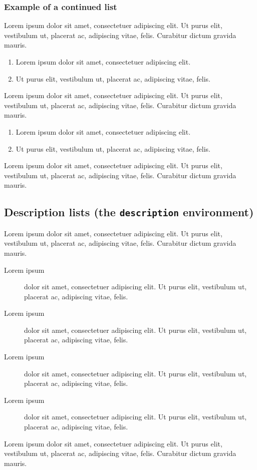 \documentclass[draft*,nochapters]{aaltoseries}
\begin{document}
\subsubsection{Example of a continued list}
Lorem ipsum dolor sit amet, consectetuer adipiscing elit. Ut purus elit,  vestibulum ut, placerat ac, adipiscing vitae, felis. Curabitur dictum gravida mauris.
\begin{enumerate}
\setlength{\itemsep}{0mm}
\item Lorem ipsum dolor sit amet, consectetuer adipiscing elit.
\item Ut purus elit,  vestibulum ut, placerat ac, adipiscing vitae, felis.
\end{enumerate}
Lorem ipsum dolor sit amet, consectetuer adipiscing elit. Ut purus elit,  vestibulum ut, placerat ac, adipiscing vitae, felis. Curabitur dictum gravida mauris.
\begin{enumerate}
\setlength{\itemsep}{0mm}
\setcounter{enumi}{2}
\item Lorem ipsum dolor sit amet, consectetuer adipiscing elit.
\item Ut purus elit,  vestibulum ut, placerat ac, adipiscing vitae, felis.
\end{enumerate}
Lorem ipsum dolor sit amet, consectetuer adipiscing elit. Ut purus elit,  vestibulum ut, placerat ac, adipiscing vitae, felis. Curabitur dictum gravida mauris.

\subsection{Description lists (the \texttt{description} environment)}

Lorem ipsum dolor sit amet, consectetuer adipiscing elit. Ut purus elit,  vestibulum ut, placerat ac, adipiscing vitae, felis. Curabitur dictum gravida mauris.
\begin{description}
\item[Lorem ipsum] dolor sit amet, consectetuer adipiscing elit. Ut purus elit,  vestibulum ut, placerat ac, adipiscing vitae, felis.
\item[Lorem ipsum] dolor sit amet, consectetuer adipiscing elit. Ut purus elit,  vestibulum ut, placerat ac, adipiscing vitae, felis.
\item[Lorem ipsum] dolor sit amet, consectetuer adipiscing elit. Ut purus elit,  vestibulum ut, placerat ac, adipiscing vitae, felis.
\item[Lorem ipsum] dolor sit amet, consectetuer adipiscing elit. Ut purus elit,  vestibulum ut, placerat ac, adipiscing vitae, felis.
\end{description}
Lorem ipsum dolor sit amet, consectetuer adipiscing elit. Ut purus elit,  vestibulum ut, placerat ac, adipiscing vitae, felis. Curabitur dictum gravida mauris.
\end{document}
